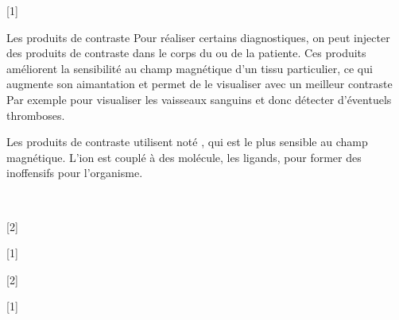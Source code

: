 [1]


\begin{doc}{Les produits de contraste}
  Pour réaliser certains diagnostiques, on peut injecter des produits de contraste dans le corps du ou de la patiente.
  Ces produits améliorent la sensibilité au champ magnétique d'un tissu particulier, ce qui augmente son aimantation et permet de le visualiser avec un meilleur contraste
  Par exemple pour visualiser les vaisseaux sanguins et donc détecter d'éventuels thromboses.

  Les produits de contraste utilisent  noté , qui est le plus sensible au champ magnétique.
  L'ion est couplé à des molécule, les ligands, pour former des  inoffensifs pour l'organisme.

  \begin{center}
     \\[6pt]
  \end{center}
\end{doc}


[2]

[1]

[2]

[1]
